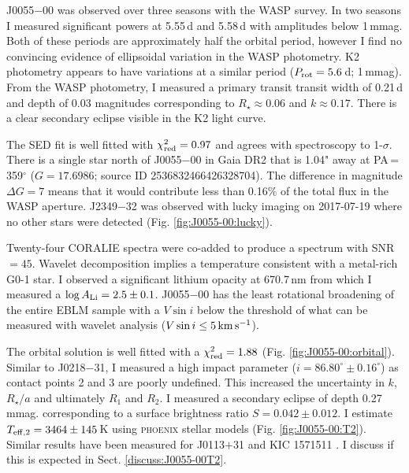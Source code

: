 
J0055$-$00 was observed over three seasons with the WASP survey. In two seasons I measured significant powers at 5.55\,d and 5.58\,d with amplitudes below 1\,mmag. Both of these periods are approximately half the orbital period, however I find no convincing evidence of ellipsoidal variation in the WASP photometry. K2 photometry appears to have variations at a similar period ($P_{\rm rot} = 5.6$\,d; 1\,mmag). 
From the WASP photometry, I measured a primary transit transit width of 0.21\,d and depth of 0.03 magnitudes corresponding to $R_\star \approx 0.06$ and $k \approx 0.17$. There is a clear secondary eclipse visible in the K2 light curve.

The SED fit is well fitted with $\chi^2_{\rm red} = 0.97$ and agrees with spectroscopy to 1-$\sigma$.
There is a single star north of J0055$-$00 in Gaia DR2 that is 1.04" away at PA\,=\,359$^\circ$ ($G = 17.6986$; source ID 2536832466426328704). The difference in magnitude $\Delta G = 7$ means that it would contribute less than 0.16\% of the total flux in the WASP aperture. J2349$-$32 was observed with lucky imaging on 2017-07-19 where no other stars were detected (Fig. \ref{fig:J0055-00:lucky}). 

Twenty-four CORALIE spectra were co-added to produce a spectrum with SNR$ = 45$. Wavelet decomposition implies a temperature consistent with a metal-rich G0-1 star. I observed a significant lithium opacity at 670.7\,nm from which I measured a $\log A_{\rm Li}  = 2.5 \pm 0.1$. J0055$-$00 has the least rotational broadening of the entire EBLM sample with a $V\sin i$ below the threshold of what can be measured with wavelet analysis ($V \sin i \leq 5\,\rm km\, \rm s^{-1}$).

The orbital solution is well fitted with a $\chi_{\rm red}^2=1.88$ (Fig. \ref{fig:J0055-00:orbital}). Similar to J0218$-$31, I measured a high impact parameter ($i = 86.80^\circ \pm 0.16^\circ$) as contact points 2 and 3 are poorly undefined. This increased the uncertainty in $k$, $R_\star / a$ and ultimately $R_1$ and $R_2$. I measured a secondary eclipse of depth  0.27\,mmag. corresponding to a surface brightness ratio $S = 0.042 \pm 0.012$. I estimate $T_{\rm eff,2} = 3464 \pm 145$\,K using \textsc{phoenix} stellar models (Fig. \ref{fig:J0055-00:T2}). Similar results have been measured for J0113$+$31 \citep{2014A&A...572A..50G} and KIC 1571511 \citep{2012MNRAS.423L...1O}. I discuss if this is expected in Sect. \ref{discuss:J0055-00T2}.

